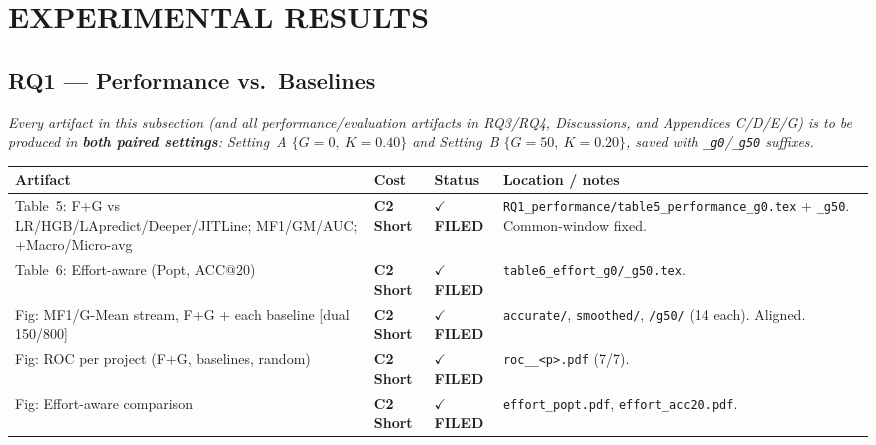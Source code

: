 \documentclass[10pt]{article}
\providecommand{\code}[1]{\texttt{\small #1}}
\newcommand{\Ctwo}{\textcolor{blue!65!black}{\textbf{C2 Short}}}
\newcommand{\dual}{\textcolor{purple!70!black}{[dual 150/800]}}
\newcommand{\DONE}{\textcolor{green!45!black}{\textbf{$\checkmark$ FILED}}}
\begin{document}
\section*{EXPERIMENTAL RESULTS}

\subsection*{RQ1 --- Performance vs.\ Baselines}
\emph{Every artifact in this subsection (and all performance/evaluation artifacts in
RQ3/RQ4, Discussions, and Appendices C/D/E/G) is to be produced in \textbf{both paired
settings}: Setting~A $\{G\!=\!0,\ K\!=\!0.40\}$ and Setting~B $\{G\!=\!50,\ K\!=\!0.20\}$,
saved with \code{\_g0}/\code{\_g50} suffixes.}
\begin{longtable}{p{7.0cm}p{1.4cm}p{1.6cm}p{5.4cm}}
\toprule
Artifact & Cost & Status & Location / notes \\ \midrule\endhead
Table~5: F+G vs LR/HGB/LApredict/Deeper/JITLine; MF1/GM/AUC; +Macro/Micro-avg & \Ctwo & \DONE & \code{RQ1\_performance/table5\_performance\_g0.tex} + \code{\_g50}. Common-window fixed. \\
Table~6: Effort-aware (Popt, ACC@20) & \Ctwo & \DONE & \code{table6\_effort\_g0/\_g50.tex}. \\
Fig: MF1/G-Mean stream, F+G + each baseline \dual & \Ctwo & \DONE & \code{accurate/}, \code{smoothed/}, \code{*/g50/} (14 each). Aligned. \\
Fig: ROC per project (F+G, baselines, random) & \Ctwo & \DONE & \code{roc\_\_<p>.pdf} (7/7). \\
Fig: Effort-aware comparison & \Ctwo & \DONE & \code{effort\_popt.pdf}, \code{effort\_acc20.pdf}. \\
\bottomrule
\end{longtable}
\end{document}
